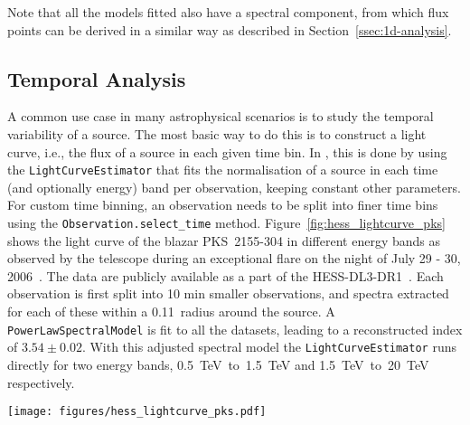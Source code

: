 \documentclass[longauth]{aa}
\newcommand{\todo}[1]{\textcolor{red}{TODO: #1}\PackageWarning{TODO:}{#1!}}
\newcommand{\code}[1]{\texttt{#1}}
\begin{document}
Note that all the models fitted also have a spectral component, from which flux
points can be derived in a similar way as described in Section~\ref{ssec:1d-analysis}.

\subsection{Temporal Analysis}
\label{ssec:temporal-analysis}
A common use case in many astrophysical scenarios is to study the temporal
variability of a source. The most basic way to do this is to construct a
light curve, i.e., the flux of a source in each given time bin. In \gammapy, this
is done by using the \code{LightCurveEstimator} that fits the normalisation of a
source in each time (and optionally energy) band per observation, keeping constant
other parameters.
For custom time binning, an observation needs to be split into finer time bins using
the \code{Observation.select\_time} method. Figure~\ref{fig:hess_lightcurve_pks}
shows the light curve of the blazar PKS~2155-304 in different energy bands as
observed by the \hess telescope during an exceptional flare on the night of
July 29 - 30, 2006~\cite{2009A&A...502..749A}. The data are publicly available 
as a part of the HESS-DL3-DR1~\cite{HESS_DR1}. Each observation is first split into 10 min smaller
observations, and spectra extracted for each of these within a 0.11\textdegree~radius
around the source. A \code{PowerLawSpectralModel} is fit to all the datasets, leading
to a reconstructed index of $3.54 \pm 0.02$. With this adjusted spectral model
the \code{LightCurveEstimator} runs directly for two energy bands,
\SI{0.5}{TeV}~to~\SI{1.5}{TeV} and \SI{1.5}{TeV}~to~\SI{20}{TeV} respectively.
%
\begin{figure*}[t]
    \sidecaption
	\texttt{[image: figures/hess\_lightcurve\_pks.pdf]}
	\caption{
        Binned PKS~2155-304 light curve in two different energy bands
        as observed by the \hess telescopes in 2006. The coloured markers
        show the flux points in the different energy bands:
		the range from (\SI{0.5}{TeV}~to~\SI{1.5}{TeV} is shown in blue, while
		the range from \SI{1.5}{TeV}~to~\SI{20}{TeV}) is shown in orange.
		The horizontal error illustrates the width of the time bin of 10~min. The vertical
        error bars show the associated asymmetrical flux errors. The marker
        is set to the center of the time bin.
    }
    \label{fig:hess_lightcurve_pks}
\end{figure*}
\end{document}
